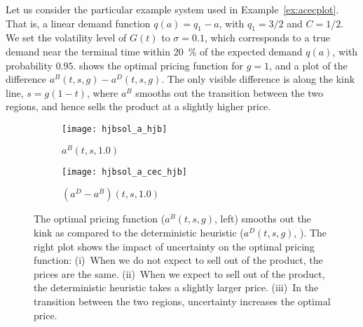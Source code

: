 \documentclass[main.tex]{subfiles}
\begin{document}
\begin{example}\label{ex:function_impact_uncertainty}
  Let us consider the particular example system used in
  Example~\ref{ex:acecplot}. %
  That is, a linear demand function $q(a)=q_1-a$, with $q_1=3/2$
  and $C=1/2$.
  We set the volatility level of $G(t)$ to $\sigma=0.1$, which
  corresponds to a true demand near the terminal time within \SI{20}{\percent} of the
  expected demand $q(a)$, with probability $0.95$.
   shows the
  optimal pricing function for $g=1$, and a plot of the difference
  $a^B(t,s,g)-a^D(t,s,g)$. The only visible difference is along the kink
  line, $s=g(1-t)$, where $a^B$ smooths out the transition between
  the two regions, and hence sells the product at a slightly higher
  price.
  \begin{figure}[htb]
    \centering
    \begin{subfigure}[b]{0.5\textwidth}
      \texttt{[image: hjbsol\_a\_hjb]}
      \caption{$a^B(t,s,1.0)$}
    \end{subfigure}%
    \begin{subfigure}[b]{0.5\textwidth}
      \texttt{[image: hjbsol\_a\_cec\_hjb]}
      \caption{$(a^D-a^B)(t,s,1.0)$}
    \end{subfigure}%
    \caption{The optimal pricing function ($a^B(t,s,g)$, left) smooths out the
      kink as compared to the deterministic heuristic ($a^D(t,s,g)$,
      ).
      The right plot shows the impact of uncertainty on the optimal
      pricing function: (i)~When we do not expect to sell out of the
      product, the prices are the same. (ii)~When we expect to sell out
      of the product, the deterministic heuristic takes a slightly larger
      price.
      (iii)~In the transition between the two regions, uncertainty
      increases the optimal price.
    }\label{fig:hjbsol_a}
  \end{figure}
\end{example}
\end{document}
